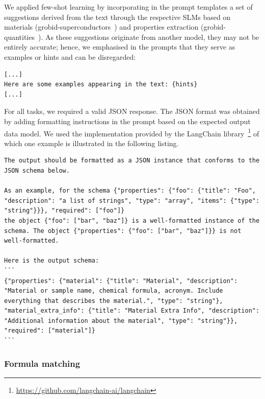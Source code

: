 \documentclass[a4paper]{article}
\begin{document}
We applied few-shot learning by incorporating in the prompt templates a set of suggestions derived from the text through the respective SLMs based on materials (grobid-superconductors~\cite{lfoppiano2023automatic}) and properties extraction (grobid-quantities~\cite{foppiano2019quantities}). 
As these suggestions originate from another model, they may not be entirely accurate; hence, we emphasised in the prompts that they serve as examples or hints and can be disregarded: 

\begin{lstlisting}[caption=Few-shot learning modified prompt template.]
[...]
Here are some examples appearing in the text: {hints}
[...]
\end{lstlisting}

For all tasks, we required a valid JSON response. The JSON format was obtained by adding formatting instructions in the prompt based on the expected output data model. 
We used the implementation provided by the LangChain library~\footnote{\url{https://github.com/langchain-ai/langchain}} of which one example is illustrated in the following listing. 

\begin{lstlisting}[caption=Example of formatting instruction to a valid JSON format]
The output should be formatted as a JSON instance that conforms to the JSON schema below.

As an example, for the schema {"properties": {"foo": {"title": "Foo", "description": "a list of strings", "type": "array", "items": {"type": "string"}}}, "required": ["foo"]}
the object {"foo": ["bar", "baz"]} is a well-formatted instance of the schema. The object {"properties": {"foo": ["bar", "baz"]}} is not well-formatted.

Here is the output schema:
```
{"properties": {"material": {"title": "Material", "description": "Material or sample name, chemical formula, acronym. Include everything that describes the material.", "type": "string"}, "material_extra_info": {"title": "Material Extra Info", "description": "Additional information about the material", "type": "string"}}, "required": ["material"]}
```
\end{lstlisting}

\subsubsection{Formula matching}
\end{document}
